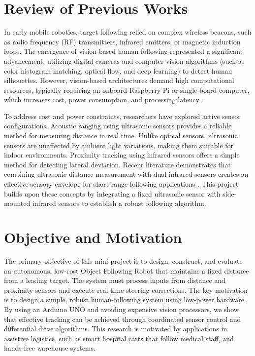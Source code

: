 \documentclass[12pt,a4paper,oneside]{report}
\begin{document}
\section{Review of Previous Works}
In early mobile robotics, target following relied on complex wireless beacons, such as radio frequency (RF) transmitters, infrared emitters, or magnetic induction loops. The emergence of vision-based human following represented a significant advancement, utilizing digital cameras and computer vision algorithms (such as color histogram matching, optical flow, and deep learning) to detect human silhouettes. However, vision-based architectures demand high computational resources, typically requiring an onboard Raspberry Pi or single-board computer, which increases cost, power consumption, and processing latency \cite{ultrasonic_ref}.\par
\medskip
To address cost and power constraints, researchers have explored active sensor configurations. Acoustic ranging using ultrasonic sensors provides a reliable method for measuring distance in real time. Unlike optical sensors, ultrasonic sensors are unaffected by ambient light variations, making them suitable for indoor environments. Proximity tracking using infrared sensors offers a simple method for detecting lateral deviation. Recent literature demonstrates that combining ultrasonic distance measurement with dual infrared sensors creates an effective sensory envelope for short-range following applications \cite{following_ref}. This project builds upon these concepts by integrating a fixed ultrasonic sensor with side-mounted infrared sensors to establish a robust following algorithm.

\section{Objective and Motivation}
The primary objective of this mini project is to design, construct, and evaluate an autonomous, low-cost Object Following Robot that maintains a fixed distance from a leading target. The system must process inputs from distance and proximity sensors and execute real-time steering corrections. The key motivation is to design a simple, robust human-following system using low-power hardware. By using an Arduino UNO and avoiding expensive vision processors, we show that effective tracking can be achieved through coordinated sensor control and differential drive algorithms. This research is motivated by applications in assistive logistics, such as smart hospital carts that follow medical staff, and hands-free warehouse systems.
\end{document}
